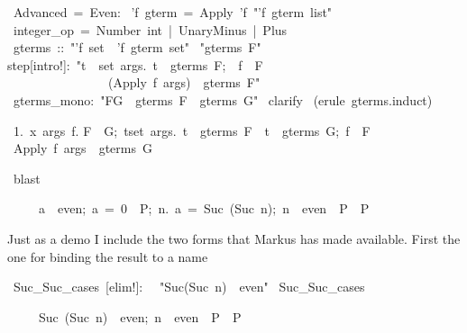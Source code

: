 %
\begin{isabelle}
\def\isabellecontext{Advanced}
\isanewline
{}\ Advanced\ =\ Even:\isanewline
\isanewline
\isanewline
{}\ 'f\ gterm\ =\ Apply\ 'f\ "'f\ gterm\ list"\isanewline
\isanewline
{}\ integer_op\ =\ Number\ int\ |\ UnaryMinus\ |\ Plus\isanewline
\isanewline
{}\ gterms\ ::\ "'f\ set\ \isasymRightarrow \ 'f\ gterm\ set"\isanewline
{}\ "gterms\ F"\isanewline
{}\isanewline
step[intro!]:\ "\isasymlbrakk \isasymforall t\ \isasymin \ set\ args.\ t\ \isasymin \ gterms\ F;\ \ f\ \isasymin \ F\isasymrbrakk \isanewline
\ \ \ \ \ \ \ \ \ \ \ \ \ \ \ \isasymLongrightarrow \ (Apply\ f\ args)\ \isasymin \ gterms\ F"\isanewline
\isanewline
{}\ gterms_mono:\ "F\isasymsubseteq G\ \isasymLongrightarrow \ gterms\ F\ \isasymsubseteq \ gterms\ G"\isanewline
{}\ clarify\isanewline
{}\ (erule\ gterms.induct)
\begin{isamarkuptxt}
\begin{isabelle}
\ 1.\ \isasymAnd x\ args\ f.\isanewline
{}\isasymlbrakk F\ \isasymsubseteq \ G;\ \isasymforall t\isasymin set\ args.\ t\ \isasymin \ gterms\ F\ \isasymand \ t\ \isasymin \ gterms\ G;\ f\ \isasymin \ F\isasymrbrakk \isanewline
{}\isasymLongrightarrow \ Apply\ f\ args\ \isasymin \ gterms\ G%
\end{isabelle}
\end{isamarkuptxt}
\ blast\isanewline
{}
\begin{isamarkuptext}
\begin{isabelle}
\ \ \ \ \ \isasymlbrakk a\ \isasymin \ even;\ a\ =\ 0\ \isasymLongrightarrow \ P;\ \isasymAnd n.\ \isasymlbrakk a\ =\ Suc\ (Suc\ n);\ n\ \isasymin \ even\isasymrbrakk \ \isasymLongrightarrow \ P\isasymrbrakk \ \isasymLongrightarrow \ P%
\end{isabelle}

Just as a demo I include
the two forms that Markus has made available. First the one for binding the
result to a name%
\end{isamarkuptext}
\ Suc_Suc_cases\ [elim!]:\isanewline
\ \ "Suc(Suc\ n)\ \isasymin \ even"\isanewline
\isanewline
{}\ Suc_Suc_cases%
\begin{isamarkuptext}
\begin{isabelle}
\ \ \ \ \ \isasymlbrakk Suc\ (Suc\ n)\ \isasymin \ even;\ n\ \isasymin \ even\ \isasymLongrightarrow \ P\isasymrbrakk \ \isasymLongrightarrow \ P%
\end{isabelle}


\end{isamarkuptext}
\end{isabelle}
